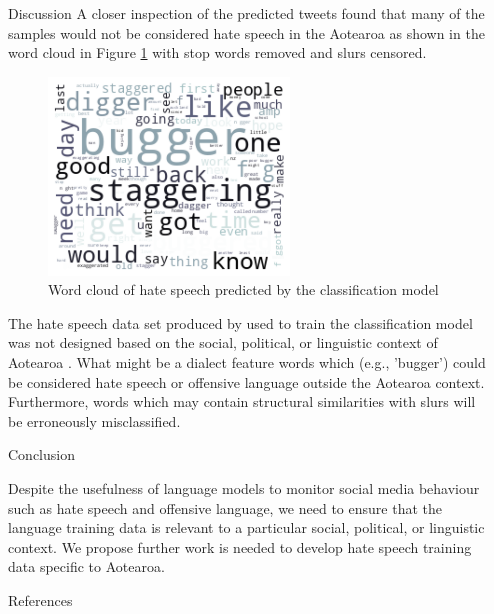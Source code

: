 \documentclass[final]{beamer}
\newlength{\sepwidth}
\newlength{\smallcolwidth}
\newcommand{\separatorcolumn}{\begin{column}{\sepwidth}\end{column}}
\begin{document}
\begin{frame}[t]
\begin{columns}[t]
\begin{column}{\smallcolwidth}
\begin{block}{Discussion}
  A closer inspection of the predicted tweets found that many of the samples would not be considered hate speech in the Aotearoa as shown in the word cloud in Figure \ref{fig:4} with stop words removed and slurs censored.
  
  \begin{figure}
    \includegraphics[width=0.6\textwidth]{poster/figures/word_cloud.png}
        \caption{Word cloud of hate speech predicted by the classification model}
        \label{fig:4}    
    \end{figure}

    \end{block}

    The hate speech data set produced by  used to train the classification model was not designed based on the social, political, or linguistic context of Aotearoa \cite{davidson_automated_2017}. What might be a dialect feature words which  (e.g., 'bugger') could be considered hate speech or offensive language outside the Aotearoa context. Furthermore, words which may contain structural similarities with slurs will be erroneously misclassified.
    
    \begin{block}{Conclusion}

    Despite the usefulness of language models to monitor social media behaviour such as hate speech and offensive language, we need to ensure that the language training data is relevant to a particular social, political, or linguistic context. We propose further work is needed to develop hate speech training data specific to Aotearoa.
    
  \end{block}

  \begin{block}{References}

    \nocite{*}
    \footnotesize{}

  \end{block}

\end{column}

\separatorcolumn
\end{columns}
\end{frame}
\end{document}
